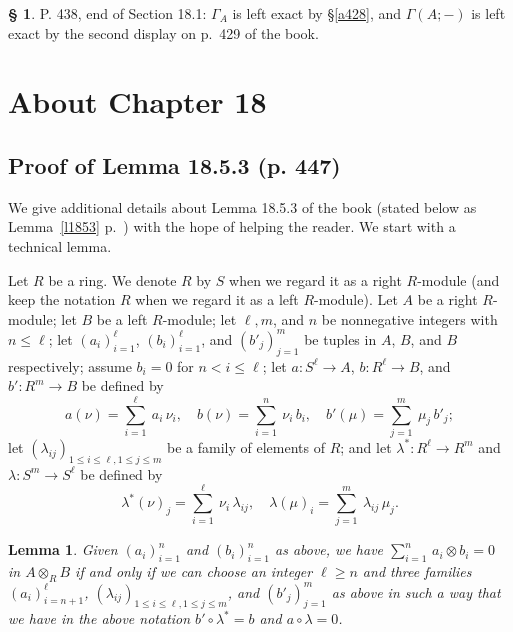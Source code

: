 \documentclass[12pt]{article}%
\newtheorem{lem}[thm]{Lemma}
\theoremstyle{remark}
\theoremstyle{definition}
\newtheorem{s}[thm]{\S}%
\begin{document}
%

\begin{s}\label{a438}
P. 438, end of Section 18.1: $\Gamma_A$ is left exact by \S\ref{a428}, and $\Gamma(A;-)$ is left exact by the second display on p.~429 of the book.
\end{s}


\section{About Chapter 18}

\subsection{Proof of Lemma 18.5.3 (p. 447)}%

We give additional details about Lemma 18.5.3 of the book (stated below as Lemma~\ref{l1853} p.~\pageref{l1853}) with the hope of helping the reader. We start with a technical lemma.

Let $R$ be a ring. We denote $R$ by $S$ when we regard it as a right $R$-module (and keep the notation $R$ when we regard it as a left $R$-module). Let $A$ be a right $R$-module; let $B$ be a left $R$-module; let $\ell,m$, and $n$ be nonnegative integers with $n\le\ell$; let $(a_i)_{i=1}^\ell$, $(b_i)_{i=1}^\ell$, and $(b'_j)_{j=1}^m$ be tuples in $A$, $B$, and $B$ respectively; assume $b_i=0$ for $n<i\le\ell$; let $a:S^\ell\to A$, $b:R^\ell\to B$, and $b':R^m\to B$ be defined by 
$$
a(\nu)=\sum_{i=1}^\ell\ a_i\,\nu_i,\quad b(\nu)=\sum_{i=1}^n\ \nu_i\,b_i,\quad b'(\mu)=\sum_{j=1}^m\ \mu_j\,b'_j;
$$ 
let $(\lambda_{ij})_{1\le i\le\ell,1\le j\le m}$ be a family of elements of $R$; and let $\lambda^*:R^\ell\to R^m$ and $\lambda:S^m\to S^\ell$ be defined by 
$$
\lambda^*(\nu)_j=\sum_{i=1}^\ell\ \nu_i\,\lambda_{ij},\quad
\lambda(\mu)_i=\sum_{j=1}^m\ \lambda_{ij}\,\mu_j.
$$
%
\begin{lem}\label{techlem}
Given $(a_i)_{i=1}^n$ and $(b_i)_{i=1}^n$ as above, we have $\sum_{i=1}^n\,a_i\otimes b_i=0$ 
%
in $A\otimes_RB$ if and only if we can choose an integer $\ell\ge n$ and three families $(a_i)_{i=n+1}^\ell$, $(\lambda_{ij})_{1\le i\le\ell,1\le j\le m}$, and $(b'_j)_{j=1}^m$ as above in such a way that we have in the above notation $b'\circ\lambda^*=b$ and $a\circ\lambda=0$.
\end{lem}
%
\end{document}
